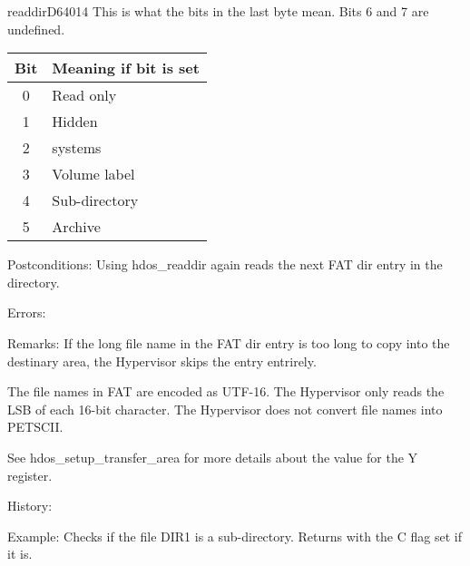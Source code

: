 \begin{hyppotrap}{readdir}{D640}{14}
  This is what the bits in the last byte mean. Bits 6 and 7 are undefined.
  {\setlength{\tabcolsep}{2mm}
  \begin{tabular}{|c|l|}
  \hline
  \textbf{Bit} & \textbf{Meaning if bit is set} \\
  \hline
  0 & Read only         \\
  1 & Hidden            \\
  2 & systems           \\
  3 & Volume label      \\
  4 & Sub-directory     \\
  5 & Archive           \\
  \hline
  \end{tabular}
  }
\item [Postconditions:]
  Using hdos\_readdir again reads the next FAT dir entry in the directory.
\item [Errors:]
\item [Remarks:]
  If the long file name in the FAT dir entry is too long to copy into the
  destinary area, the Hypervisor skips the entry entrirely.

  The file names in FAT are encoded as UTF-16. The Hypervisor only reads the LSB
  of each 16-bit character. The Hypervisor does not convert file names into
  PETSCII.

  See hdos\_setup\_transfer\_area for more details about the value for the Y
  register.
\item [History:]
\item [Example:]
  Checks if the file DIR1 is a sub-directory. Returns with the C flag set if it
  is.

  \TODO
\end{hyppotrap}


